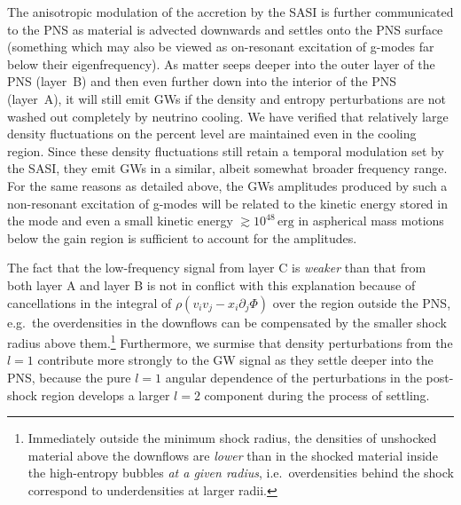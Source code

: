 The anisotropic modulation of the accretion by the SASI is further
communicated to the PNS as material is advected downwards and settles
onto the PNS surface (something which may also be viewed as
on-resonant excitation of g-modes far below their
eigenfrequency). As matter seeps deeper into the outer layer of the PNS (layer~B) and
then even further down into the interior of the PNS (layer~A), it will still
emit GWs if the density and entropy perturbations are
not washed out completely by neutrino cooling. We have verified that
relatively large density fluctuations on the percent level are maintained
even in the cooling region. Since these density fluctuations still
retain a temporal modulation set by the SASI, they emit GWs in a similar, albeit somewhat broader frequency range. For the
same reasons as detailed above, the GWs amplitudes produced by
such a non-resonant excitation of g-modes will be related to
the kinetic energy stored in the mode and even a small kinetic
energy $\gtrsim 10^{48}  \, \mathrm{erg}$ in aspherical
mass motions below the gain region is sufficient to account
for the amplitudes.

The fact that the low-frequency signal from layer C
is \emph{weaker} than that from both layer A and layer B
is not in conflict with this explanation
because of cancellations in
the integral of $ \rho \left ( v_i v_j - x_i \partial_j \Phi \right) $
over the region outside the PNS, e.g.\ the overdensities in
the downflows can be compensated by the smaller shock radius
above them.\footnote{Immediately outside the minimum shock radius, the densities
of unshocked material above the downflows are \emph{lower} than in the shocked
material inside the high-entropy bubbles \emph{at a given radius}, i.e.\ overdensities
behind the shock correspond to underdensities at larger radii.}
Furthermore, we surmise that
density perturbations from the $l=1$ contribute more strongly to
the GW signal as they settle deeper into the PNS, because the pure
$l=1$ angular dependence of the perturbations in the post-shock
region develops a larger $l=2$ component during the process of settling.


